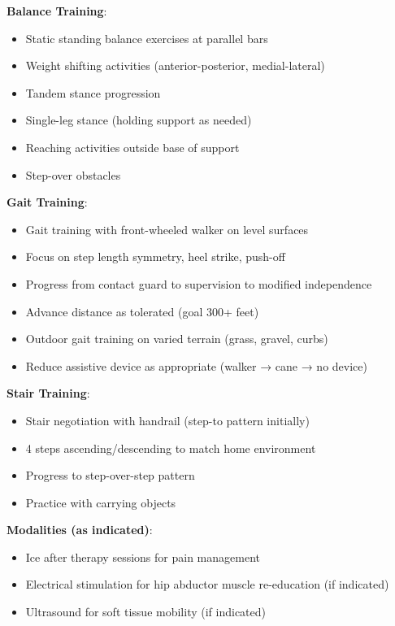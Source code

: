 \documentclass[11pt,letterpaper]{article}
\begin{document}
\textbf{Balance Training}:
\begin{itemize}[leftmargin=*]
    \item Static standing balance exercises at parallel bars
    \item Weight shifting activities (anterior-posterior, medial-lateral)
    \item Tandem stance progression
    \item Single-leg stance (holding support as needed)
    \item Reaching activities outside base of support
    \item Step-over obstacles
\end{itemize}

\textbf{Gait Training}:
\begin{itemize}[leftmargin=*]
    \item Gait training with front-wheeled walker on level surfaces
    \item Focus on step length symmetry, heel strike, push-off
    \item Progress from contact guard to supervision to modified independence
    \item Advance distance as tolerated (goal 300+ feet)
    \item Outdoor gait training on varied terrain (grass, gravel, curbs)
    \item Reduce assistive device as appropriate (walker → cane → no device)
\end{itemize}

\textbf{Stair Training}:
\begin{itemize}[leftmargin=*]
    \item Stair negotiation with handrail (step-to pattern initially)
    \item 4 steps ascending/descending to match home environment
    \item Progress to step-over-step pattern
    \item Practice with carrying objects
\end{itemize}

\textbf{Modalities (as indicated)}:
\begin{itemize}[leftmargin=*]
    \item Ice after therapy sessions for pain management
    \item Electrical stimulation for hip abductor muscle re-education (if indicated)
    \item Ultrasound for soft tissue mobility (if indicated)
\end{itemize}
\end{document}
